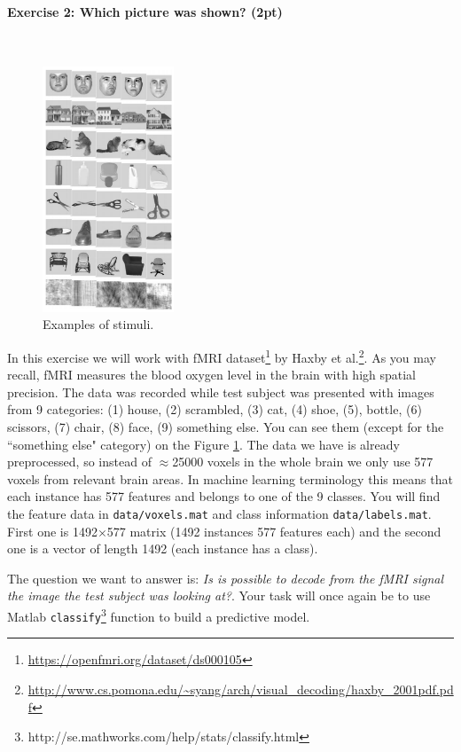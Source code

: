 \documentclass[a4paper,11pt]{article}
\newenvironment{exercise}[3]{\paragraph{Exercise #1: #2 (#3pt)}\ \\}{
\medskip}
\begin{document}
\pagebreak
%
%
\begin{exercise}{2}{Which picture was shown?}{2}
\begin{figure}
	\centering
	\vspace{-45pt}
	\includegraphics[width=0.35\textwidth]{stimuli.png}
	\caption{Examples of stimuli.}
	\label{fig:stimuli}
	\vspace{-20pt}
\end{figure}
In this exercise we will work with fMRI dataset\footnote{\url{https://openfmri.org/dataset/ds000105}} by Haxby et al.\footnote{\url{http://www.cs.pomona.edu/~syang/arch/visual_decoding/haxby_2001pdf.pdf}}. As you may recall, fMRI measures the blood oxygen level in the brain with high spatial precision. The data was recorded while test subject was presented with images from 9 categories: (1) house,  (2) scrambled, (3) cat, (4) shoe, (5), bottle, (6) scissors, (7) chair, (8) face, (9) something else. You can see them (except for the ``something else" category) on the Figure \ref{fig:stimuli}. The data we have is already preprocessed, so instead of $\approx$25000 voxels in the whole brain we only use 577 voxels from relevant brain areas. In machine learning terminology this means that each instance has 577 features and belongs to one of the 9 classes. You will find the feature data in \texttt{data/voxels.mat} and class information \texttt{data/labels.mat}. First one is 1492$\times$577 matrix (1492 instances 577 features each) and the second one is a vector of length 1492 (each instance has a class).

The question we want to answer is: \emph{Is is possible to decode from the fMRI signal the image the test subject was looking at?}. Your task will once again be to use Matlab \texttt{classify}\footnote{http://se.mathworks.com/help/stats/classify.html} function to build a predictive model.\\


\end{exercise}
\end{document}
